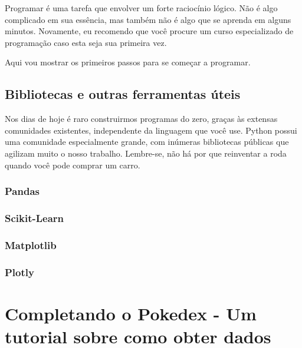 \documentclass[]{book}
\begin{document}
Programar é uma tarefa que envolver um forte raciocínio lógico. Não é algo complicado em sua essência, mas também não é algo que se aprenda em alguns minutos. Novamente, eu recomendo que você procure um curso especializado de programação caso esta seja sua primeira vez.

Aqui vou mostrar os primeiros passos para se começar a programar.

\hypertarget{bibliotecas-e-outras-ferramentas-uxfateis}{%
\section{Bibliotecas e outras ferramentas úteis}\label{bibliotecas-e-outras-ferramentas-uxfateis}}

Nos dias de hoje é raro construirmos programas do zero, graças às extensas comunidades existentes, independente da linguagem que você use. Python possui uma comunidade especialmente grande, com inúmeras bibliotecas públicas que agilizam muito o nosso trabalho. Lembre-se, não há por que reinventar a roda quando você pode comprar um carro.

\hypertarget{pandas}{%
\subsection{Pandas}\label{pandas}}

\hypertarget{scikit-learn}{%
\subsection{Scikit-Learn}\label{scikit-learn}}

\hypertarget{matplotlib}{%
\subsection{Matplotlib}\label{matplotlib}}

\hypertarget{plotly}{%
\subsection{Plotly}\label{plotly}}

\hypertarget{completando-o-pokedex---um-tutorial-sobre-como-obter-dados}{%
\chapter{Completando o Pokedex - Um tutorial sobre como obter dados}\label{completando-o-pokedex---um-tutorial-sobre-como-obter-dados}}
\end{document}
